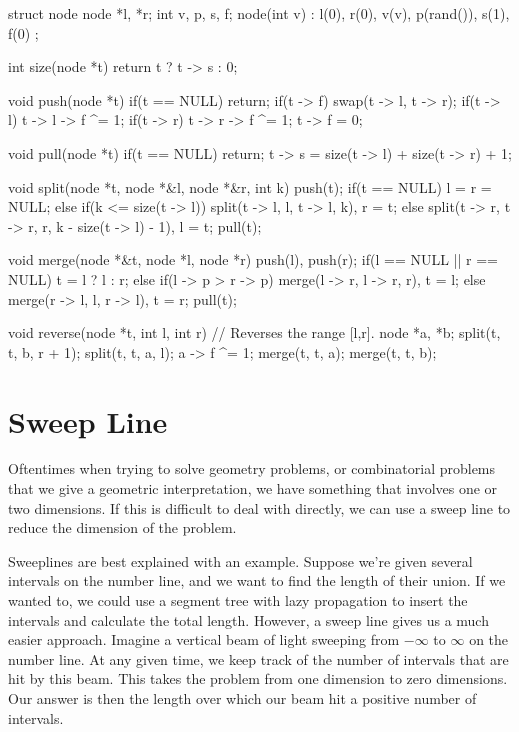 \begin{mylstlisting}[language=C++]
struct node {
  node *l, *r;
  int v, p, s, f;
  node(int v) : l(0), r(0), v(v), p(rand()), s(1), f(0) {}
};

int size(node *t){
  return t ? t -> s : 0;
}

void push(node *t){
  if(t == NULL) return;
  if(t -> f){
    swap(t -> l, t -> r);
    if(t -> l) t -> l -> f ^= 1;
    if(t -> r) t -> r -> f ^= 1;
    t -> f = 0;
  }
}

void pull(node *t){
  if(t == NULL) return;
  t -> s = size(t -> l) + size(t -> r) + 1;
}

void split(node *t, node *&l, node *&r, int k){
  push(t);
  if(t == NULL) l = r = NULL;
  else if(k <= size(t -> l)) split(t -> l, l, t -> l, k), r = t;
  else split(t -> r, t -> r, r, k - size(t -> l) - 1), l = t;
  pull(t);
}

void merge(node *&t, node *l, node *r){
  push(l), push(r);
  if(l == NULL || r == NULL) t = l ? l : r;
  else if(l -> p > r -> p) merge(l -> r, l -> r, r), t = l;
  else merge(r -> l, l, r -> l), t = r;
  pull(t);
}

void reverse(node *t, int l, int r){
  // Reverses the range [l,r].
  node *a, *b;
  split(t, t, b, r + 1);
  split(t, t, a, l);
  a -> f ^= 1;
  merge(t, t, a);
  merge(t, t, b);
}
\end{mylstlisting}

\section{Sweep Line}

Oftentimes when trying to solve geometry problems, or combinatorial problems that we give a geometric interpretation, we have something that involves one or two dimensions. If this is difficult to deal with directly, we can use a sweep line to reduce the dimension of the problem.

Sweeplines are best explained with an example. Suppose we're given several intervals on the number line, and we want to find the length of their union. If we wanted to, we could use a segment tree with lazy propagation to insert the intervals and calculate the total length. However, a sweep line gives us a much easier approach. Imagine a vertical beam of light sweeping from $-\infty$ to $\infty$ on the number line. At any given time, we keep track of the number of intervals that are hit by this beam. This takes the problem from one dimension to zero dimensions. Our answer is then the length over which our beam hit a positive number of intervals.


